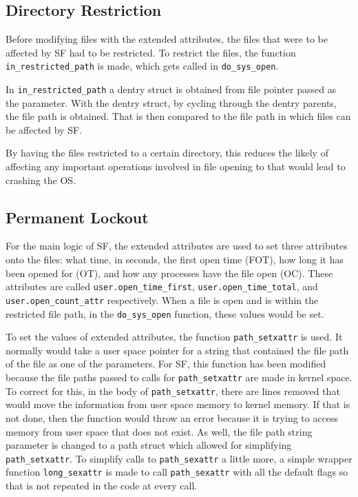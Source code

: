 \subsection{Directory Restriction}
Before modifying files with the extended attributes, the files that were to be affected by SF had to be restricted. To restrict the files, the function \texttt{in\_restricted\_path} is made, which gets called in \texttt{do\_sys\_open}. 

In \texttt{in\_restricted\_path} a dentry struct is obtained from file pointer passed as the parameter. With the dentry struct, by cycling through the dentry parents, the file path is obtained. That is then compared to the file path in which files can be affected by SF.

By having the files restricted to a certain directory, this reduces the likely of affecting any important operations involved in file opening to that would lead to crashing the OS. 

\subsection{Permanent Lockout}
For the main logic of SF, the extended attributes are used to set three attributes onto the files: what time, in seconds, the first open time (FOT), how long it has been opened for (OT), and how any processes have the file open (OC). These attributes are called \texttt{user.open\_time\_first}, \texttt{user.open\_time\_total}, and \texttt{user.open\_count\_attr} respectively. When a file is open and is within the restricted file path, in the \texttt{do\_sys\_open} function, these values would be set.

To set the values of extended attributes, the function \texttt{path\_setxattr} is used. It normally would take a user space pointer for a string that contained the file path of the file as one of the parameters. For SF, this function has been modified because the file paths passed to calls for \texttt{path\_setxattr} are made in kernel space. To correct for this, in the body of \texttt{path\_setxattr}, there are lines removed that would move the information from user space memory to kernel memory. If that is not done, then the function would throw an error because it is trying to access memory from user space that does not exist. As well, the file path string parameter is changed to a path struct which allowed for simplifying \texttt{path\_setxattr}. To simplify calls to \texttt{path\_sexattr} a little more, a simple wrapper function \texttt{long\_sexattr} is made to call \texttt{path\_sexattr} with all the default flags so that is not repeated in the code at every call.

